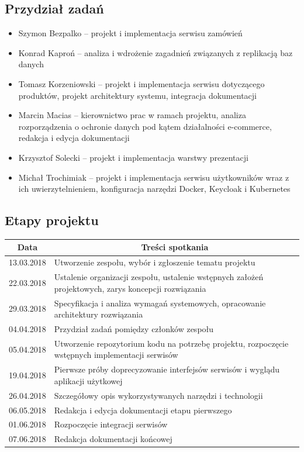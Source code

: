 \documentclass[11pt,a4paper,twoside]{article}
\begin{document}
\subsection{Przydział zadań}
\begin{itemize}
\item Szymon Bezpalko -- projekt i implementacja serwisu zamówień
\item Konrad Kaproń -- analiza i wdrożenie zagadnień związanych z replikacją baz danych
\item Tomasz Korzeniowski -- projekt i implementacja serwisu dotyczącego produktów, projekt architektury systemu, integracja dokumentacji
\item Marcin Macias -- kierownictwo prac w ramach projektu,  analiza rozporządzenia o ochronie danych pod kątem działalności e-commerce, redakcja i edycja dokumentacji
\item Krzysztof Solecki -- projekt i implementacja warstwy prezentacji
\item Michał Trochimiak -- projekt i implementacja serwisu użytkowników wraz z ich uwierzytelnieniem, konfiguracja narzędzi Docker, Keycloak i Kubernetes
\end{itemize}

\newpage
\subsection{Etapy projektu}
\begin{table}[ht]
\label{etapyProjektu}
\centering
\begin{tabularx}{\textwidth}{|l|X|}
\hline
 \multicolumn{1}{|c|}{Data} & \multicolumn{1}{c|}{Treści spotkania} \\\hline
 13.03.2018 & Utworzenie zespołu, wybór i zgłoszenie tematu projektu \\\hline
 22.03.2018 & Ustalenie organizacji zespołu, ustalenie wstępnych założeń projektowych, zarys koncepcji rozwiązania \\\hline
 29.03.2018 & Specyfikacja i analiza wymagań systemowych, opracowanie architektury rozwiązania \\\hline
 04.04.2018 & Przydział zadań pomiędzy członków zespołu \\\hline
 05.04.2018 & Utworzenie repozytorium kodu na potrzebę projektu, rozpoczęcie wstępnych implementacji serwisów \\\hline
 19.04.2018 & Pierwsze próby doprecyzowanie interfejsów serwisów i wyglądu aplikacji użytkowej \\\hline
 26.04.2018 & Szczegółowy opis wykorzystywanych narzędzi i technologii \\\hline
 06.05.2018 & Redakcja i edycja dokumentacji etapu pierwszego\\\hline
 01.06.2018 & Rozpoczęcie integracji serwisów \\\hline
 07.06.2018 & Redakcja dokumentacji końcowej\\\hline
\end{tabularx}
\end{table}
\end{document}
